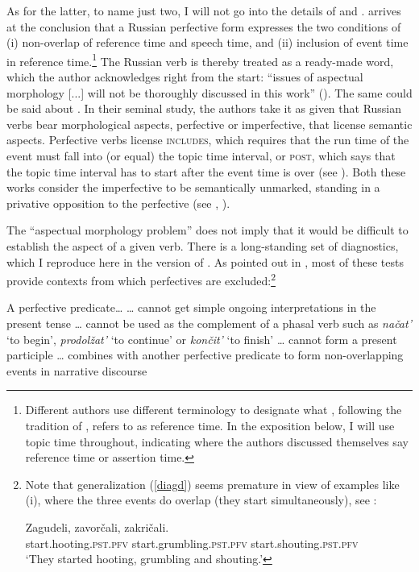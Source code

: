 \documentclass[output=paper,colorlinks,citecolor=brown]{langscibook}
\begin{document}
As for the latter, to name just two, I will not go into the details of \citet{Borik2006} and \citet{Paslawska.Stechow2003}.
\citet[166--167]{Borik2006} arrives at the conclusion that a Russian perfective form expresses the two conditions of (i) non-overlap of reference time and speech time, and (ii) inclusion of event time in reference time.\footnote{\label{reftop}Different authors use different terminology to designate what \citet{Borik2006}, following the tradition of \citet{Reichenbach47}, refers to as reference time. In the exposition below, I will use topic time throughout, indicating where the authors discussed themselves say reference time or assertion time.} The Russian verb is thereby treated as a ready-made word, which the author acknowledges right from the start: ``issues of aspectual morphology [...] will not be thoroughly discussed in this work'' (\citealt[3]{Borik2006}). The same could be said about \citet{Paslawska.Stechow2003}. In their seminal study, 
the authors take it as given that Russian verbs bear morphological aspects, perfective or imperfective, that license semantic aspects. Perfective verbs license \textsc{includes}, 
which requires that the run time of the event must fall into (or equal) the topic time interval,
or \textsc{post}, which says that the topic time interval has to start after the event time is over (see \citealt[322]{Paslawska.Stechow2003}). Both these works consider the imperfective to be semantically unmarked, standing in a privative opposition to the perfective (see \citealt[336]{Paslawska.Stechow2003}, \citealt[186]{Borik2006}).

The ``aspectual morphology problem'' does not imply that it would be difficult to establish the aspect of a given verb. There is a long-standing set of diagnostics, which I reproduce here in the version of \citet[1698]{Ramchand08}. As pointed out in \citet[22]{Zinova2021}, most of these tests provide contexts from which perfectives are excluded:\footnote{\label{kicker}Note that generalization (\ref{diagd}) seems premature in view of examples like (i), where the three events do overlap (they start simultaneously), see \citet[224]{Dickey2000}:

\ea\label{fn} 
\gll Zagudeli, zavorčali, zakričali. \\
start.hooting.\textsc{pst.pfv} start.grumbling.\textsc{pst.pfv}
start.shouting.\textsc{pst.pfv}\\
\glt `They started hooting, grumbling and shouting.'
\z}

\eanoraggedright\label{diag} A perfective predicate\dots
\eanoraggedright\label{diaga} {\dots} cannot get simple ongoing interpretations in the present tense
\ex\label{diagb} {\dots} cannot be used as the complement of a phasal verb such as \textit{načat'} `to begin', \textit{prodolžat'} `to continue' or \textit{končit'} `to finish'
\ex\label{diagc} {\dots} cannot 
form a present participle
\ex\label{diagd} {\dots} combines with another perfective predicate to form non-overlapping events in narrative discourse
\z\z
\end{document}
